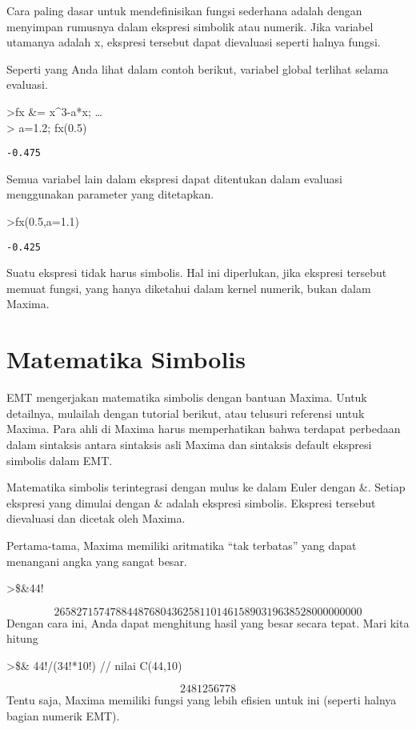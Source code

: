 \documentclass[
]{book}
\begin{document}
Cara paling dasar untuk mendefinisikan fungsi sederhana adalah dengan menyimpan rumusnya dalam ekspresi simbolik atau numerik. Jika variabel utamanya adalah x, ekspresi tersebut dapat dievaluasi seperti halnya fungsi.

Seperti yang Anda lihat dalam contoh berikut, variabel global terlihat selama evaluasi.

\textgreater fx \&= x\^{}3-a*x; \ldots{}\\
\textgreater{} a=1.2; fx(0.5)

\begin{verbatim}
-0.475
\end{verbatim}

Semua variabel lain dalam ekspresi dapat ditentukan dalam evaluasi menggunakan parameter yang ditetapkan.

\textgreater fx(0.5,a=1.1)

\begin{verbatim}
-0.425
\end{verbatim}

Suatu ekspresi tidak harus simbolis. Hal ini diperlukan, jika ekspresi tersebut memuat fungsi, yang hanya diketahui dalam kernel numerik, bukan dalam Maxima.

\chapter{Matematika Simbolis}\label{matematika-simbolis}

EMT mengerjakan matematika simbolis dengan bantuan Maxima. Untuk detailnya, mulailah dengan tutorial berikut, atau telusuri referensi untuk Maxima. Para ahli di Maxima harus memperhatikan bahwa terdapat perbedaan dalam sintaksis antara sintaksis asli Maxima dan sintaksis default ekspresi simbolis dalam EMT.

Matematika simbolis terintegrasi dengan mulus ke dalam Euler dengan \&. Setiap ekspresi yang dimulai dengan \& adalah ekspresi simbolis. Ekspresi tersebut dievaluasi dan dicetak oleh Maxima.

Pertama-tama, Maxima memiliki aritmatika ``tak terbatas'' yang dapat menangani angka yang sangat besar.

\textgreater\$\&44!

\[2658271574788448768043625811014615890319638528000000000\]Dengan cara ini, Anda dapat menghitung hasil yang besar secara tepat. Mari kita hitung

\textgreater\$\& 44!/(34!*10!) // nilai C(44,10)

\[2481256778\]Tentu saja, Maxima memiliki fungsi yang lebih efisien untuk ini (seperti halnya bagian numerik EMT).
\end{document}
